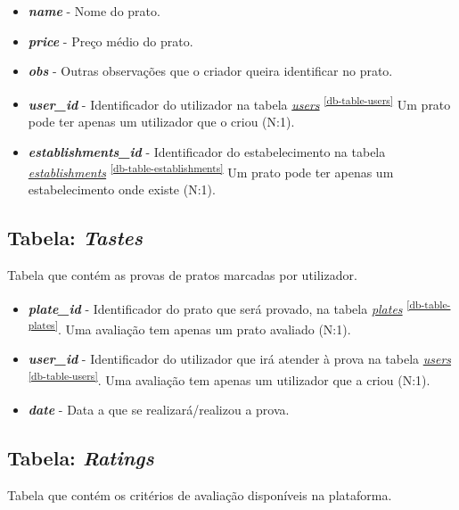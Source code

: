 \documentclass[11pt, a4paper, sans]{article}
\begin{document}
	\begin{itemize}
		\item \textbf{\textit{name}} - Nome do prato.
		\item \textbf{\textit{price}} - Preço médio do prato.
		\item \textbf{\textit{obs}} - Outras observações que o criador queira identificar no prato.
		\item \textbf{\textit{user\_id}} - Identificador do utilizador na tabela 
			\underline{\textit{users}} \textsuperscript{\ref{db-table-users}} 
			Um prato pode ter apenas um utilizador que o criou (N:1).
		\item \textbf{\textit{establishments\_id}} - Identificador do estabelecimento na tabela 
			\underline{\textit{establishments}} \textsuperscript{\ref{db-table-establishments}} 
			Um prato pode ter apenas um estabelecimento onde existe (N:1).
	\end{itemize}

	\subsection{Tabela: \textit{Tastes}} \label{db-table-tastes}
	
	Tabela que contém as provas de pratos marcadas por utilizador.
	
	\begin{itemize}
		\item \textbf{\textit{plate\_id}} - Identificador do prato que será provado, na tabela 
			\underline{\textit{plates}} \textsuperscript{\ref{db-table-plates}}. 
			Uma avaliação tem apenas um prato avaliado (N:1).
		\item \textbf{\textit{user\_id}} - Identificador do utilizador que irá atender à prova na tabela 
			\underline{\textit{users}} \textsuperscript{\ref{db-table-users}}.
			Uma avaliação tem apenas um utilizador que a criou (N:1).	
		\item \textbf{\textit{date}} - Data a que se realizará/realizou a prova.		
	\end{itemize}

	\subsection{Tabela: \textit{Ratings}} \label{db-table-ratings}

	Tabela que contém os critérios de avaliação disponíveis na plataforma.
\end{document}
